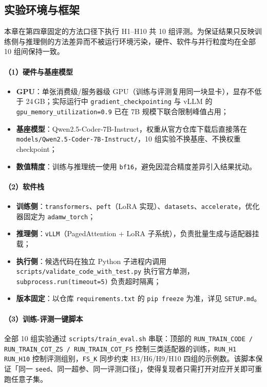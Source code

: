 \subsection{实验环境与框架}

本章在第四章固定的方法口径下执行 H1--H10 共 10 组评测。为保证结果只反映训练侧与推理侧的方法差异而不被运行环境污染，硬件、软件与并行粒度均在全部 10 组间保持一致。

\paragraph{（1）硬件与基座模型}
\begin{itemize}
    \item \textbf{GPU}：单张消费级/服务器级 GPU（训练与评测复用同一块显卡），显存不低于 24\,GB；实际运行中 \texttt{gradient\_checkpointing} 与 vLLM 的 \texttt{gpu\_memory\_utilization=0.9} 已在 7B 规模下联合限制峰值占用；
    \item \textbf{基座模型}：Qwen2.5-Coder-7B-Instruct，权重从官方仓库下载后直接落在 \texttt{models/Qwen2.5-Coder-7B-Instruct/}，10 组实验不换基座、不换权重 checkpoint；
    \item \textbf{数值精度}：训练与推理统一使用 \texttt{bf16}，避免因混合精度差异引入结果扰动。
\end{itemize}

\paragraph{（2）软件栈}
\begin{itemize}
    \item \textbf{训练侧}：\texttt{transformers}、\texttt{peft}（LoRA 实现）、\texttt{datasets}、\texttt{accelerate}，优化器固定为 \texttt{adamw\_torch}；
    \item \textbf{推理侧}：\texttt{vLLM}（PagedAttention + LoRA 子系统），负责批量生成与适配器挂载；
    \item \textbf{执行侧}：候选代码在独立 Python 子进程内调用 \texttt{scripts/validate\_code\_with\_test.py} 执行官方单测，\texttt{subprocess.run(timeout=5)} 负责超时隔离；
    \item \textbf{版本固定}：以仓库 \texttt{requirements.txt} 的 \texttt{pip freeze} 为准，详见 \texttt{SETUP.md}。
\end{itemize}

\paragraph{（3）训练-评测一键脚本}
全部 10 组实验通过 \texttt{scripts/train\_eval.sh} 串联：顶部的 \texttt{RUN\_TRAIN\_CODE / RUN\_TRAIN\_COT\_ZS / RUN\_TRAIN\_COT\_FS} 控制三类适配器的训练，\texttt{RUN\_H1 ~ RUN\_H10} 控制评测组别，\texttt{FS\_K} 同步约束 H3/H6/H9/H10 四组的示例数。该脚本保证「同一 \texttt{seed}、同一超参、同一评测口径」，使得复现者只需打开对应开关即可重跑任意子集。
